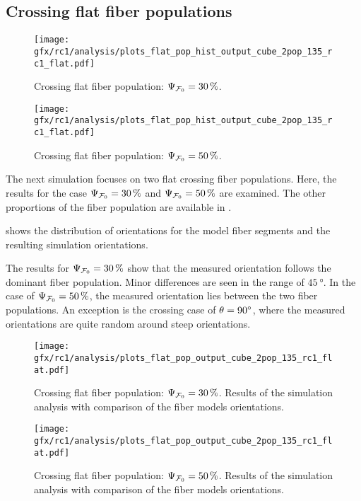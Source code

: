 \subsection{Crossing flat fiber populations}
\label{sec:resCrossFlat}
%
\begin{figure}[!p]
\centering
\texttt{[image: gfx/rc1/analysis/plots\_flat\_pop\_hist\_output\_cube\_2pop\_135\_rc1\_flat.pdf]}
\caption{Crossing flat fiber population: $\textnormal{$\Psi_{\textnormal{$\mathcal{F}_0$}}$}=\SI{30}{\percent}$.}
\label{fig:flat_03_fiber_pop_hist}
% 
\vspace{2em}
\texttt{[image: gfx/rc1/analysis/plots\_flat\_pop\_hist\_output\_cube\_2pop\_135\_rc1\_flat.pdf]}
\caption{Crossing flat fiber population: $\textnormal{$\Psi_{\textnormal{$\mathcal{F}_0$}}$}=\SI{50}{\percent}$.}
\label{fig:flat_05_fiber_pop_hist}
\end{figure}
%
The next simulation focuses on two flat crossing fiber populations.
Here, the results for the case $\textnormal{$\Psi_{\textnormal{$\mathcal{F}_0$}}$} = \SI{30}{\percent}$ and $\textnormal{$\Psi_{\textnormal{$\mathcal{F}_0$}}$} = \SI{50}{\percent}$ are examined.
The other proportions of the fiber population are available in .
\par
%
 shows the distribution of orientations for the model fiber segments and the resulting simulation orientations.
\par
% 
The results for $\textnormal{$\Psi_{\textnormal{$\mathcal{F}_0$}}$} = \SI{30}{\percent}$ show that the measured orientation follows the dominant fiber population.
Minor differences are seen in the range of $\SI{45}{\degree}$.
In the case of $\textnormal{$\Psi_{\textnormal{$\mathcal{F}_0$}}$} = \SI{50}{\percent}$, the measured orientation lies between the two fiber populations.
An exception is the crossing case of $\textnormal{$\theta$}=\SI{90}{\degree}$, where the measured orientations are quite random around steep orientations.
\par
%
\begin{figure}[!p]
\centering
\texttt{[image: gfx/rc1/analysis/plots\_flat\_pop\_output\_cube\_2pop\_135\_rc1\_flat.pdf]}
\caption{Crossing flat fiber population: $\textnormal{$\Psi_{\textnormal{$\mathcal{F}_0$}}$}=\SI{30}{\percent}$. Results of the simulation analysis with comparison of the fiber models orientations.}
\label{fig:flat_03_fiber_pop_rofl}
\end{figure}
%
\begin{figure}[!p]
\centering
\texttt{[image: gfx/rc1/analysis/plots\_flat\_pop\_output\_cube\_2pop\_135\_rc1\_flat.pdf]}
\caption{Crossing flat fiber population: $\textnormal{$\Psi_{\textnormal{$\mathcal{F}_0$}}$}=\SI{50}{\percent}$. Results of the simulation analysis with comparison of the fiber models orientations.}
\label{fig:flat_05_fiber_pop_rofl}
\end{figure}
